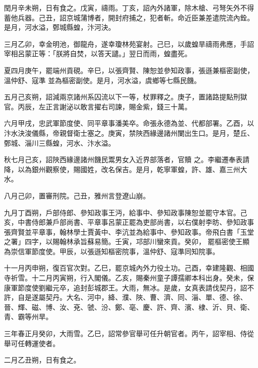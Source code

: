 \begin{pinyinscope}
 閏月辛未朔，日有食之。戊寅，禱雨。丁亥，詔內外諸軍，除木槍、弓弩矢外不得蓄他兵器。己丑，詔京城蒲博者，開封府捕之，犯者斬。命近臣兼差遣院流內銓。是月，河水溢，鄄城縣蝗，汴河決。



 三月乙卯，幸金明池，御龍舟，遂幸瓊林苑宴射。己巳，以歲蝗旱禱雨弗應，手詔宰相呂蒙正等：「朕將自焚，以答天譴。」翌日而雨，蝗盡死。



 夏四月庚午，罷端州貢硯。辛巳，以張齊賢、陳恕並參知政事，張遜兼樞密副使，溫仲舒、寇準
 並為樞密副使。是月，河水溢，虞鄉等七縣民饑。



 五月己亥朔，詔減兩京諸州系囚流以下一等，杖罪釋之。庚子，置諸路提點刑獄官。丙辰，左正言謝泌以敢言擢右司諫，賜金紫，錢三十萬。



 六月甲戌，忠武軍節度使、同平章事潘美卒。命張永德為並、代都部署。乙酉，以汴水決浚儀縣，帝親督衛士塞之。庚寅，禁陜西緣邊諸州闌出生口。是月，楚丘、鄄城、淄川三縣蝗，河水、汴水溢。



 秋七月己亥，詔陜西緣邊諸州饑民鬻男女入近界部落者，官贖
 之。李繼遷奉表請降，以為銀州觀察使，賜國姓，改名保吉。是月，乾寧軍蝗，許、雄、嘉三州大水。



 八月己卯，置審刑院。己丑，雅州言登遼山崩。



 九月丁酉朔，戶部侍郎、參知政事王沔，給事中、參知政事陳恕並罷守本官。己亥，中書侍郎兼戶部尚書、平章事呂蒙正罷為吏部尚書，以右僕射李昉、參知政事張齊賢並平章事，翰林學士賈黃中、李沆並為給事中、參知政事。帝飛白書「玉堂之署」四字，以賜翰林承旨蘇易簡。壬寅，邛部川蠻來貢。癸卯，
 罷樞密使王顯為崇信軍節度使。甲辰，以張遜知樞密院事，溫仲舒、寇準同知院事。



 十一月丙申朔，復百官次對。乙巳，罷京城內外力役土功。己酉，幸建隆觀、相國寺祈雪。十二月丙寅朔，行入閣儀。乙亥，賜秦州童子譚孺卿本科出身。癸未，保康軍節度使劉繼元卒，追封彭城郡王。大雨，無冰。是歲，女真表請伐契丹，詔不許，自是遂屬契丹。大名、河中，絳、濮、陜、曹、濟、同、淄、單、德、徐、晉、輝、磁、博、汝、兗、虢、汾、鄭、亳、慶、許、齊、濱、棣、沂、貝、衛、青、霸等州旱。



 三年春正月癸卯，大雨雪。乙巳，詔常參官舉可任升朝官者。丙午，詔宰相、侍從舉可任轉運使者。



 二月乙丑朔，日有食之。




\end{pinyinscope}
